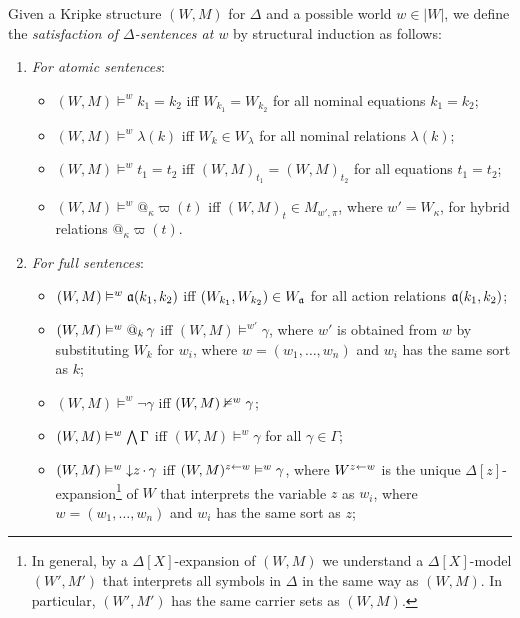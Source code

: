\documentclass[a4paper,UKenglish,cleveref,autoref]{lipics-v2019}
\begin{document}
Given a Kripke structure $(W, M)$ for $\Delta$ and a possible world $w \in |W|$, we define the \emph{satisfaction of $\Delta$-sentences at $w$} by structural induction as follows:
\begin{enumerate}

\item \emph{For atomic sentences}:
  \begin{itemize}

  \item $(W, M) \models^{w} k_{1} = k_{2}$ iff $W_{k_{1}} = W_{k_{2}}$ for all nominal equations $k_{1} = k_{2}$;

  \item $(W, M) \models^{w} \lambda(k)$ iff $W_{k} \in W_{\lambda}$ for all nominal relations $\lambda(k)$;

  \item $(W, M) \models^{w} t_1 = t_2$ iff $(W,M)_{t_1}=(W,M)_{t_2}$ for all equations $ t_1 = t_2 $;

  \item $(W, M) \models^{w} @_\kappa\varpi(t)$ iff $(W, M)_t \in M_{w',\pi}$, where $w' = W_\kappa$, for hybrid relations $@_\kappa\varpi(t)$.

  \end{itemize}

\item \emph{For full sentences}:
  \begin{itemize}

  \item $(W, M) \vDash^{w} \mathfrak{a}(k_{1}, k_{2})$ iff $(W_{k_{1}}, W_{k_{2}}) \in W_{\mathfrak{a}}$ for all action relations $\mathfrak{a}(k_{1}, k_{2})$;

  \item $(W, M) \vDash^{w} @_{k}\, \gamma$ iff $(W, M) \models^{w'} \gamma$, where $w'$ is obtained from $w$ by substituting $W_k$ for $w_i$, where $w=(w_1,\dots, w_n)$ and $w_i$ has the same sort as $k$;
  
  \item $(W, M) \models^{w} \neg \gamma$ iff $(W, M) \nvDash^{w} \gamma$;

  \item $(W, M) \vDash^{w} \textstyle\bigwedge \Gamma$ iff $(W, M) \models^{w} \gamma$ for all $\gamma \in \Gamma$; 

  \item $(W, M) \vDash^{w} {\downarrow}z\,{\cdot}\,{\gamma}$ iff $(W, M)^{z \leftarrow w} \vDash^{w} \gamma$, 
    where $W^{z \leftarrow w}$ is the unique $\Delta[z]$-expansion\footnote{In general, by a $\Delta[X]$-expansion of $(W, M)$ we understand a $\Delta[X]$-model $(W', M')$ that interprets all symbols in $\Delta$ in the same way as $(W, M)$. In particular, $(W', M')$ has the same carrier sets as $(W, M)$.} of $W$ that interprets the variable $z$ as $w_i$, where $w=(w_1,\dots,w_n)$ and $w_i$ has the same sort as $z$;


\end{itemize}
\end{enumerate}
\end{document}
